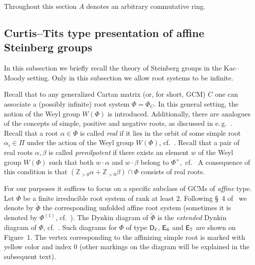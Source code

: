 Throughout this section $A$ denotes an arbitrary commutative ring.

\subsection{Curtis--Tits type presentation of affine Steinberg groups} \label{subsec:curtis-tits}
In this subsection we briefly recall the theory of Steinberg groups in the Kac--Moody setting.
Only in this subsection we allow root systems to be infinite.

Recall that to any generalized Cartan matrix (or, for short, GCM) $C$ one can associate a (possibly infinite) root system $\Phi = \Phi_C$.
In this general setting, the notion of the Weyl group $W(\Phi)$ is introduced.
Additionally, there are analogues of the concepts of simple, positive and negative roots, as discussed in e.\,g.~\cite[\S~16]{Ca05}.
Recall that a root $\alpha \in \Phi$ is called \textit{real} if it lies in the orbit of some simple root $\alpha_i \in \Pi$ under the action of the Weyl group $W(\Phi)$, cf.~\cite[\S~16.3]{Ca05}.
Recall that a pair of real roots $\alpha, \beta$ is called \textit{prenilpotent} if there exists an element $w$ of the Weyl group $W(\Phi)$ such that both $w\cdot \alpha$ and $w \cdot \beta$ belong to $\Phi^+,$ cf.~\cite[\S~3]{A16}
A consequence of this condition is that $(\mathbb{Z}_{>0} \alpha + \mathbb{Z}_{>0}\beta)\cap \Phi$ consists of real roots.

For our purposes it suffices to focus on a specific subclass of GCMs of \textit{affine} type.
Let $\Phi$ be a finite irreducible root system of rank at least $2$.
Following \S~4 of~\cite{A16} we denote by $\widetilde{\Phi}$ the corresponding unfolded affine root system (sometimes it is denoted by $\Phi^{(1)}$, cf.~\cite[Table~2]{A16}).
The Dynkin diagram of $\widetilde{\Phi}$ is the \textit{extended} Dynkin diagram of $\Phi$, cf.~\cite[\S~17.1]{Ca05}.
Such diagrams for $\Phi$ of type $\mathsf{D}_\ell$, $\mathsf{E}_6$ and $\mathsf{E}_7$ are shown on Figure~1.
The vertex corresponding to the affinizing simple root is marked with yellow color and index $0$ (other markings on the diagram will be explained in the subsequent text).

